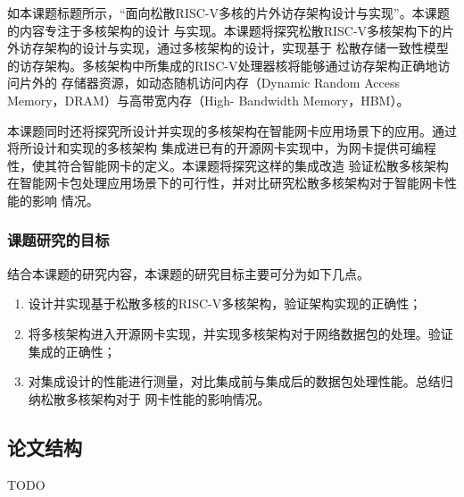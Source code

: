 如本课题标题所示，“面向松散RISC-V多核的片外访存架构设计与实现”。本课题的内容专注于多核架构的设计
与实现。本课题将探究松散RISC-V多核架构下的片外访存架构的设计与实现，通过多核架构的设计，实现基于
松散存储一致性模型的访存架构。多核架构中所集成的RISC-V处理器核将能够通过访存架构正确地访问片外的
存储器资源，如动态随机访问内存（Dynamic Random Access Memory，DRAM）与高带宽内存（High-
Bandwidth Memory，HBM）。

本课题同时还将探究所设计并实现的多核架构在智能网卡应用场景下的应用。通过将所设计和实现的多核架构
集成进已有的开源网卡实现中，为网卡提供可编程性，使其符合智能网卡的定义。本课题将探究这样的集成改造
验证松散多核架构在智能网卡包处理应用场景下的可行性，并对比研究松散多核架构对于智能网卡性能的影响
情况。

\subsubsection{课题研究的目标}



结合本课题的研究内容，本课题的研究目标主要可分为如下几点。

\begin{enumerate}
  \item 设计并实现基于松散多核的RISC-V多核架构，验证架构实现的正确性；
  \item 将多核架构进入开源网卡实现，并实现多核架构对于网络数据包的处理。验证集成的正确性；
  \item 对集成设计的性能进行测量，对比集成前与集成后的数据包处理性能。总结归纳松散多核架构对于
        网卡性能的影响情况。
\end{enumerate}

\subsection{论文结构}

TODO
